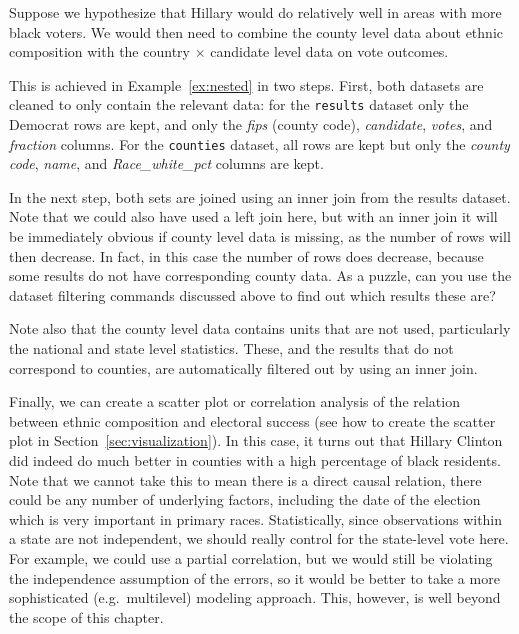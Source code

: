 {

Suppose we hypothesize that Hillary would do relatively well in areas with more black voters.
We would then need to combine the county level data about ethnic composition with the country $\times$ candidate
level data on vote outcomes.

This is achieved in Example~\ref{ex:nested} in two steps.
First, both datasets are cleaned to only contain the relevant data:
for the \texttt{results} dataset only the Democrat rows are kept, and only the \emph{fips} (county code), \emph{candidate}, \emph{votes}, and \emph{fraction} columns.
For the \texttt{counties} dataset, all rows are kept but only the \emph{county code}, \emph{name}, and \emph{Race\_white\_pct} columns are kept.


In the next step, both sets are joined using an inner join from the results dataset.
Note that we could also have used a left join here, but with an inner join it will be immediately
obvious if county level data is missing, as the number of rows will then decrease.
In fact, in this case the number of rows does decrease, because some results do not have corresponding county data.
As a puzzle, can you use the dataset filtering commands discussed above to find out which results these are?

Note also that the county level data contains units that are not used, particularly the national and state level statistics.
These, and the results that do not correspond to counties, are automatically filtered out by using an inner join.

Finally, we can create a scatter plot or correlation analysis of the relation between ethnic composition and electoral success (see how to create the scatter plot in Section~\ref{sec:visualization}).
In this case, it turns out that Hillary Clinton did indeed do much better in counties with a high percentage of black residents.
Note that we cannot take this to mean there is a direct causal relation, there could be any number of underlying factors, including the date of the election which is very important in primary races.
Statistically, since observations within a state are not independent, we should really control for the state-level vote here.
For example, we could use a partial correlation, but we would still be violating the independence assumption of the errors,
so it would be better to take a more sophisticated (e.g.\ multilevel) modeling approach.
This, however, is well beyond the scope of this chapter.


}
